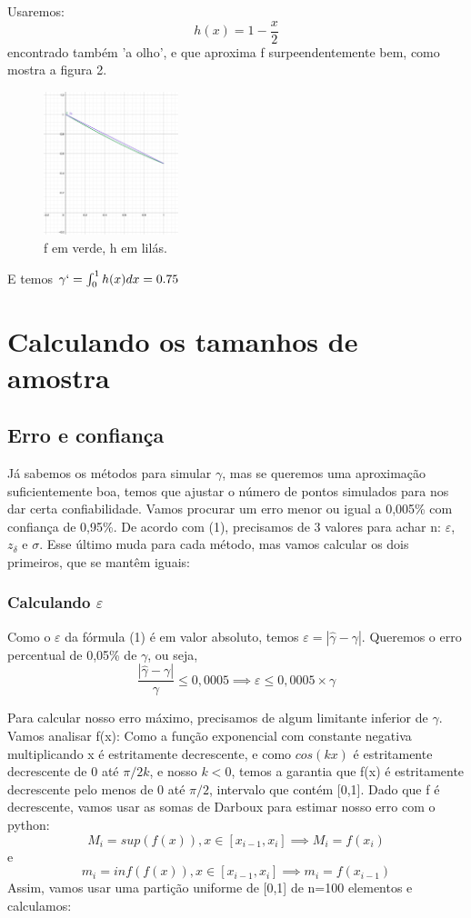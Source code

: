 \documentclass{article}
\begin{document}
Usaremos:
\[
h(x) = 1 - \frac{x}{2}
\]
encontrado também 'a olho', e que aproxima f surpeendentemente bem, como mostra a figura 2.
\begin{figure}[ht]
\centering
\includegraphics[width=0.35\textwidth]{fh.png}
\caption{\label{fig:fh} f em verde, h em lilás. }
\end{figure}

E temos $\gamma`= \int_{0}^{1} h(x)dx = 0.75 $
\newpage

\section{Calculando os tamanhos de amostra}
\subsection{Erro e confiança}

Já sabemos os métodos para simular $\gamma$, mas se queremos uma aproximação suficientemente boa, temos que ajustar o número de pontos simulados para nos dar certa confiabilidade. Vamos procurar um erro menor ou igual a 0,005\% com confiança de 0,95\%. De acordo com (1), precisamos de 3 valores para achar n: $\varepsilon$, $z_\delta$ e $\sigma$. Esse último muda para cada método, mas vamos calcular os dois primeiros, que se mantêm iguais:

\subsubsection{Calculando $\varepsilon$}
Como o $\varepsilon$ da fórmula (1) é em valor absoluto, temos $\varepsilon = |\widehat{\gamma} - \gamma|$. Queremos o erro percentual de 0,05\% de $\gamma$, ou seja,
\begin{equation}
    \frac{|\widehat{\gamma} - \gamma|}{\gamma} \leq 0,0005 \implies\varepsilon \leq 0,0005 \times \gamma
\end{equation}

Para calcular nosso erro máximo, precisamos de algum limitante inferior de $\gamma$. Vamos analisar f(x):  Como a função exponencial com constante negativa multiplicando x é estritamente decrescente, e como $cos(kx)$ é estritamente decrescente de 0 até $\pi/2k$, e nosso $k<0$, temos a garantia que f(x) é estritamente decrescente pelo menos de 0 até $\pi/2$, intervalo que contém [0,1]. Dado que f é decrescente, vamos usar as somas de Darboux para estimar nosso erro com o python:
\[
M_i = sup(f(x)), x \in [x_{i-1}, x_i] \implies M_i = f(x_i)
\]
e
\[
m_i = inf(f(x)), x \in [x_{i-1}, x_i] \implies m_i = f(x_{i-1})
\]
Assim, vamos usar uma partição uniforme de [0,1] de n=100 elementos e calculamos:
\end{document}
